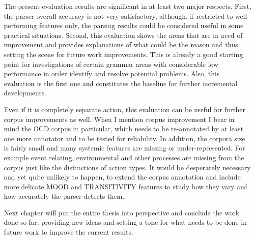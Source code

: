     The present evaluation results are significant in at least two major respects. First, the parser overall accuracy is not very satisfactory, although, if restricted to well performing features only, the parsing results could be considered useful in some practical situations. Second, this evaluation shows the areas that are in need of improvement and provides explanations of what could be the reason and thus setting the scene for future work improvements. 
    This is already a good starting point for investigations of certain grammar areas with considerable low performance in order identify and resolve potential problems. Also, this evaluation is the first one and constitutes the baseline for further incremental developments.
    
    Even if it is completely separate action, this evaluation can be useful for further corpus improvements as well. When I mention corpus improvement I bear in mind the OCD corpus in particular, which needs to be re-annotated by at least one more annotator and to be tested for reliability. In addition, the corpora size is fairly small and many systemic features are missing or under-represented. For example event relating, environmental and other processes are missing from the corpus just like the distinctions of action types. It would be desperately necessary and yet quite unlikely to happen, to extend the corpus annotation and include more delicate MOOD and TRANSITIVITY features to study how they vary and how accurately the parser detects them. 
    
    Next chapter will put the entire thesis into perspective and conclude the work done so far, providing new ideas and setting a tone for what needs to be done in future work to improve the current results.